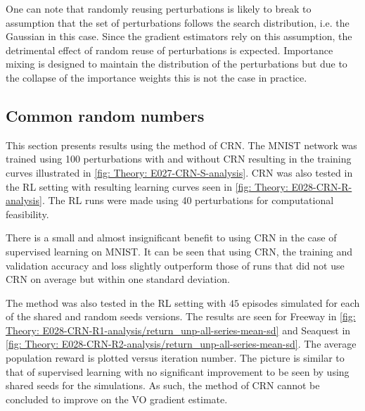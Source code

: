 One can note that randomly reusing perturbations is likely to break to assumption that the set of perturbations follows the search distribution, i.e. the Gaussian in this case. Since the gradient estimators rely on this assumption, the detrimental effect of random reuse of perturbations is expected. Importance mixing is designed to maintain the distribution of the perturbations but due to the collapse of the importance weights this is not the case in practice.











\subsection{Common random numbers}
This section presents results using the method of \gls{CRN}. The \gls{MNIST} network was trained using 100 perturbations with and without \gls{CRN} resulting in the training curves illustrated in \autoref{fig: Theory: E027-CRN-S-analysis}. \gls{CRN} was also tested in the \gls{RL} setting with resulting learning curves seen in \autoref{fig: Theory: E028-CRN-R-analysis}. The \gls{RL} runs were made using 40 perturbations for computational feasibility.

There is a small and almost insignificant benefit to using \gls{CRN} in the case of supervised learning on \gls{MNIST}. It can be seen that using \gls{CRN}, the training and validation accuracy and loss slightly outperform those of runs that did not use \gls{CRN} on average but within one standard deviation.

The method was also tested in the \gls{RL} setting with $45$ episodes simulated for each of the shared and random seeds versions.
The results are seen for Freeway in \autoref{fig: Theory: E028-CRN-R1-analysis/return_unp-all-series-mean-sd} and  Seaquest in \autoref{fig: Theory: E028-CRN-R2-analysis/return_unp-all-series-mean-sd}. The average population reward is plotted versus iteration number. 
The picture is similar to that of supervised learning with no significant improvement to be seen by using shared seeds for the simulations. 
As such, the method of \gls{CRN} cannot be concluded to improve on the \gls{VO} gradient estimate.

